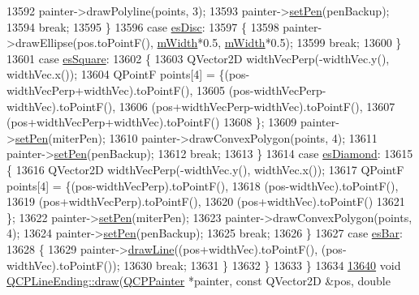 \begin{DoxyCode}
13592       painter->drawPolyline(points, 3);
13593       painter->\hyperlink{a00047_af9c7a4cd1791403901f8c5b82a150195}{setPen}(penBackup);
13594       \textcolor{keywordflow}{break};
13595     \}
13596     \textcolor{keywordflow}{case} \hyperlink{a00046_a5ef16e6876b4b74959c7261d8d4c2cd5ae5a3414916817258bcc6dddd605e8f5c}{esDisc}:
13597     \{
13598       painter->drawEllipse(pos.toPointF(),  \hyperlink{a00046_aca89d21341133c20dc6825c33a5eac48}{mWidth}*0.5, \hyperlink{a00046_aca89d21341133c20dc6825c33a5eac48}{mWidth}*0.5);
13599       \textcolor{keywordflow}{break};
13600     \}
13601     \textcolor{keywordflow}{case} \hyperlink{a00046_a5ef16e6876b4b74959c7261d8d4c2cd5ae1836502fa43d8990bb62b2d493a140a}{esSquare}:
13602     \{
13603       QVector2D widthVecPerp(-widthVec.y(), widthVec.x());
13604       QPointF points[4] = \{(pos-widthVecPerp+widthVec).toPointF(),
13605                            (pos-widthVecPerp-widthVec).toPointF(),
13606                            (pos+widthVecPerp-widthVec).toPointF(),
13607                            (pos+widthVecPerp+widthVec).toPointF()
13608                           \};
13609       painter->\hyperlink{a00047_af9c7a4cd1791403901f8c5b82a150195}{setPen}(miterPen);
13610       painter->drawConvexPolygon(points, 4);
13611       painter->\hyperlink{a00047_af9c7a4cd1791403901f8c5b82a150195}{setPen}(penBackup);
13612       \textcolor{keywordflow}{break};
13613     \}
13614     \textcolor{keywordflow}{case} \hyperlink{a00046_a5ef16e6876b4b74959c7261d8d4c2cd5a378fe5a8b768411b0bc1765210fe7200}{esDiamond}:
13615     \{
13616       QVector2D widthVecPerp(-widthVec.y(), widthVec.x());
13617       QPointF points[4] = \{(pos-widthVecPerp).toPointF(),
13618                            (pos-widthVec).toPointF(),
13619                            (pos+widthVecPerp).toPointF(),
13620                            (pos+widthVec).toPointF()
13621                           \};
13622       painter->\hyperlink{a00047_af9c7a4cd1791403901f8c5b82a150195}{setPen}(miterPen);
13623       painter->drawConvexPolygon(points, 4);
13624       painter->\hyperlink{a00047_af9c7a4cd1791403901f8c5b82a150195}{setPen}(penBackup);
13625       \textcolor{keywordflow}{break};
13626     \}
13627     \textcolor{keywordflow}{case} \hyperlink{a00046_a5ef16e6876b4b74959c7261d8d4c2cd5a2cf543bbca332df26d89bf779f50469f}{esBar}:
13628     \{
13629       painter->\hyperlink{a00047_a0b4b1b9bd495e182c731774dc800e6e0}{drawLine}((pos+widthVec).toPointF(), (pos-widthVec).toPointF());
13630       \textcolor{keywordflow}{break};
13631     \}
13632   \}
13633 \}
13634 
\hypertarget{a00115_source_l13640}{}\hyperlink{a00046_a05c143b1f66cb68d746c309523c45e3e}{13640} \textcolor{keywordtype}{void} \hyperlink{a00046_ac4b2fa94bd27b2f008b5fc090fcd7c0b}{QCPLineEnding::draw}(\hyperlink{a00047}{QCPPainter} *painter, \textcolor{keyword}{const} QVector2D &pos, \textcolor{keywordtype}{double} 

\end{DoxyCode}
